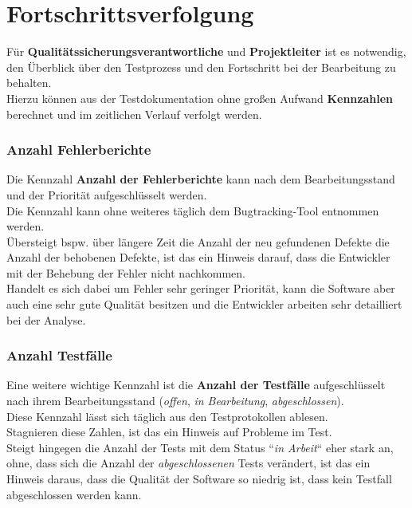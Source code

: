 \section{Fortschrittsverfolgung}
Für \textbf{Qualitätssicherungsverantwortliche} und \textbf{Projektleiter} ist es notwendig, den Überblick über den Testprozess und den Fortschritt bei der Bearbeitung zu behalten.\\
Hierzu können aus der Testdokumentation ohne großen Aufwand \textbf{Kennzahlen} berechnet und im zeitlichen Verlauf verfolgt werden.

\subsubsection*{Anzahl Fehlerberichte}
Die Kennzahl \textbf{Anzahl der Fehlerberichte} kann nach dem Bearbeitungsstand und der Priorität aufgeschlüsselt werden.\\
Die Kennzahl kann ohne weiteres täglich dem Bugtracking-Tool entnommen werden.\\
Übersteigt bspw. über längere Zeit die Anzahl der neu gefundenen Defekte die Anzahl der behobenen Defekte, ist das ein Hinweis darauf, dass die Entwickler mit der Behebung der Fehler nicht nachkommen.\\
Handelt es sich dabei um Fehler sehr geringer Priorität, kann die Software aber auch eine sehr gute Qualität besitzen und die Entwickler arbeiten sehr detailliert bei der Analyse.

\subsubsection*{Anzahl Testfälle}
Eine weitere wichtige Kennzahl ist die \textbf{Anzahl der Testfälle} aufgeschlüsselt nach ihrem Bearbeitungsstand (\textit{offen}, \textit{in Bearbeitung}, \textit{abgeschlossen}).\\
Diese Kennzahl lässt sich täglich aus den Testprotokollen ablesen.\\
Stagnieren diese Zahlen, ist das ein Hinweis auf Probleme im Test.\\
Steigt hingegen die Anzahl der Tests mit dem Status ``\textit{in Arbeit}`` eher stark an, ohne, dass sich die Anzahl der \textit{abgeschlossenen} Tests verändert, ist das ein Hinweis daraus, dass die Qualität der Software so niedrig ist, dass kein Testfall abgeschlossen werden kann.